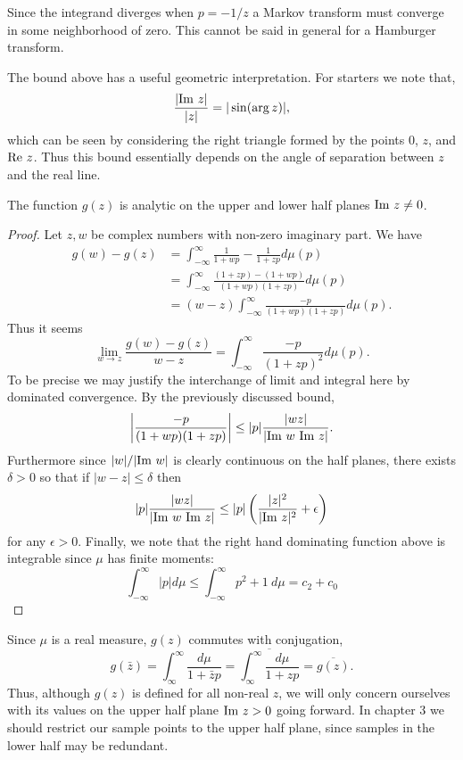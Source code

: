 Since the integrand diverges when $p = -1/z$ a Markov transform must converge in some neighborhood of zero. This cannot be said in general for a Hamburger transform. 

\begin{remark}
  The bound above has a useful geometric interpretation. For starters we note that,
  \[
    \frac{|\text{Im}~ z|}{|z|} = |\sin(\arg z)|,
  \]
  which can be seen by considering the right triangle formed by the points $0$, $z$, and $\text{Re}~ z$. Thus this bound essentially depends on the angle of separation between $z$ and the real line. 
\end{remark}

\begin{proposition}
  The function $g(z)$ is analytic on the upper and lower half planes $\text{Im}~ z \neq 0$.
\end{proposition}

\begin{proof}
  Let $z, w$ be complex numbers with non-zero imaginary part. We have
  \begin{align*}
    g(w) - g(z)
    &= \int_{-\infty}^\infty \frac{1}{1 + wp} - \frac1{1 + zp}d\mu(p) \\
    &= \int_{-\infty}^\infty \frac{(1 + zp) - (1 + wp)}{(1 + wp)(1 + zp)}d\mu(p) \\
    &= (w - z) \int_{-\infty}^\infty \frac{-p}{(1 + wp)(1 + zp)}d\mu(p).
  \end{align*}
  Thus it seems
  \[
    \lim_{w \rightarrow z} \frac{g(w) - g(z)}{w - z} = \int_{-\infty}^\infty \frac{-p}{(1+zp)^2}d\mu(p).
  \]
  To be precise we may justify the interchange of limit and integral here by dominated convergence. By the previously discussed bound,
  \[
    \left|\frac{-p}{(1 + wp)(1 + zp)}\right| \leq |p|\frac{|wz|}{|\text{Im}~ w ~\text{Im}~ z|}.
  \]
  Furthermore since $|w|/|\text{Im}~ w|$ is clearly continuous on the half planes, there exists $\delta > 0$ so that if $|w - z| \leq \delta$ then
  \[
    |p|\frac{|wz|}{|\text{Im}~ w ~\text{Im}~ z|} \leq |p|\left(\frac{|z|^2}{|\text{Im}~ z|^2} + \epsilon\right)
  \]
  for any $\epsilon > 0$. Finally, we note that the right hand dominating function above is integrable since $\mu$ has finite moments: 
  \[
    \int_{-\infty}^\infty |p| d\mu \leq \int_{-\infty}^\infty p^2 + 1 ~d\mu = c_2 + c_0
  \]
\end{proof}

\begin{remark}
  Since $\mu$ is a real measure, $g(z)$ commutes with conjugation,
  \[
    g(\bar z) = \int_\infty^\infty\frac{d\mu}{1+\bar zp} = \overline{\int_\infty^\infty\frac{d\mu}{1+zp}} = \overline{g(z)}.
  \]
  Thus, although $g(z)$ is defined for all non-real $z$, we will only concern ourselves with its values on the upper half plane $\text{Im}~ z > 0$ going forward. In chapter 3 we should restrict our sample points to the upper half plane, since samples in the lower half may be redundant.
\end{remark}


